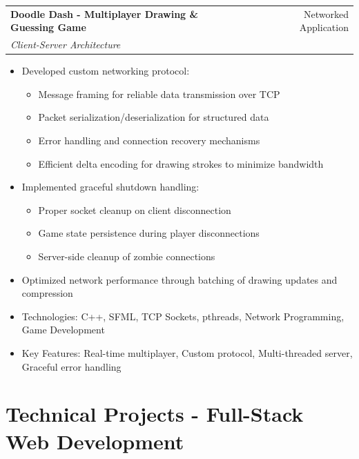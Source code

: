 \documentclass[a4paper,12pt]{article}
\makeatletter
\newenvironment{projectdetailed}[3]
    {
    \begin{tabularx}{\linewidth}{@{}l X r@{}}
    \textbf{#1} & \hfill & #2 \\
    \textit{#3} & & \\[3.75pt]
    \end{tabularx}
    \begin{minipage}[t]{\linewidth}
    \begin{itemize}[nosep,after=\strut, leftmargin=1em, itemsep=2pt,label=--]
    }
    {
    \end{itemize}
    \end{minipage}
    \vspace{6pt}
    }
\makeatother
\begin{document}
\begin{projectdetailed}{Doodle Dash - Multiplayer Drawing \& Guessing Game}{Networked Application}{Client-Server Architecture}
\begin{itemize}[nosep, leftmargin=2em]
\end{itemize}
\item Developed custom networking protocol:
\begin{itemize}[nosep, leftmargin=2em]
    \item Message framing for reliable data transmission over TCP
    \item Packet serialization/deserialization for structured data
    \item Error handling and connection recovery mechanisms
    \item Efficient delta encoding for drawing strokes to minimize bandwidth
\end{itemize}
\item Implemented graceful shutdown handling:
\begin{itemize}[nosep, leftmargin=2em]
    \item Proper socket cleanup on client disconnection
    \item Game state persistence during player disconnections
    \item Server-side cleanup of zombie connections
\end{itemize}
\item Optimized network performance through batching of drawing updates and compression
\item Technologies: C++, SFML, TCP Sockets, pthreads, Network Programming, Game Development
\item Key Features: Real-time multiplayer, Custom protocol, Multi-threaded server, Graceful error handling
\end{projectdetailed}

\section{Technical Projects - Full-Stack Web Development}
\end{document}
